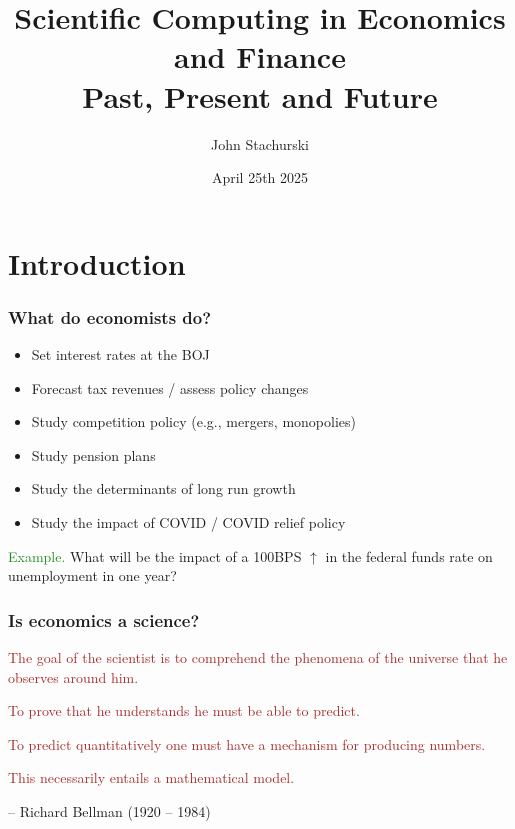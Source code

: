 \documentclass[
    xcolor={svgnames,dvipsnames},
    hyperref={colorlinks, citecolor=DeepPink4, linkcolor=DarkRed, urlcolor=DarkBlue}
    ]{beamer}  %
\title{Scientific Computing in Economics and Finance\\
    Past, Present and Future}
\author{John Stachurski}
\institute{Tokyo College and Australian National University}
\date{April 25th 2025}
\newcommand{\Eg}{\textcolor{ForestGreen}{Example. }}
\newcommand{\brown}[1]{\textcolor{Brown}{\sf #1}}
\newcommand{\1}{\mathbbm 1}
\begin{document}
\begin{frame}
  \titlepage
\end{frame}





\section{Introduction}



\begin{frame}
    \frametitle{What do economists do?}

    \begin{itemize}
        \item Set interest rates at the BOJ
            \vspace{0.3em}
        \item Forecast tax revenues / assess policy changes
            \vspace{0.3em}
        \item Study competition policy (e.g., mergers, monopolies)
            \vspace{0.3em}
        \item Study pension plans
            \vspace{0.3em}
        \item Study the determinants of long run growth
            \vspace{0.3em}
        \item Study the impact of COVID / COVID relief policy
    \end{itemize}

            \vspace{0.3em}
            \vspace{0.3em}

    \Eg What will be the impact of a 100BPS $\uparrow$ in the federal funds
    rate on unemployment in one year?

\end{frame}


\begin{frame}
    \frametitle{Is economics a science?}

    \brown{The goal of the scientist is to comprehend the phenomena of the
    universe that he observes around him.}

            \vspace{0.3em}
    \brown{To prove that he understands he must be able to predict.}

            \vspace{0.3em}
    \brown{To predict quantitatively one must have a mechanism for producing
    numbers.}

            \vspace{0.3em}
    \brown{This necessarily entails a mathematical model.}

            \vspace{0.3em}
            \vspace{0.3em}
            \vspace{0.3em}
     -- Richard Bellman (1920 -- 1984)

\end{frame}
\end{document}
